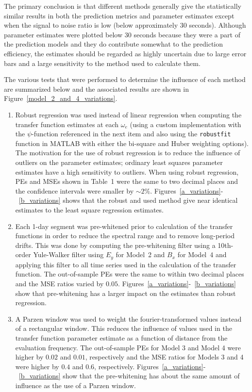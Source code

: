 \documentclass[draft,linenumbers]{agujournal2018}
\begin{document}
The primary conclusion is that different methods generally give the statistically similar results in both the prediction metrics and parameter estimates except when the signal to noise ratio is low (below approximately $30$ seconds). Although parameter estimates were plotted below $30$ seconds because they were a part of the prediction models and they do contribute somewhat to the prediction efficiency, the estimates should be regarded as highly uncertain due to large error bars and a large sensitivity to the method used to calculate them.

The various tests that were performed to determine the influence of each method are summarized below and the associated results are shown in Figure~\ref{model_2_and_4_variations}.

\begin{enumerate}

\item Robust regression was used instead of linear regression when computing the transfer function estimates at each $\omega_e$ (using a custom implementation with the $\psi$-function referenced in the next item and also using the \texttt{robustfit} function in MATLAB with either the bi-square and Huber weighting options). The motivation for the use of robust regression is to reduce the influence of outliers on the parameter estimates; ordinary least squares parameter estimates have a high sensitivity to outliers. When using robust regression, PEs and MSEs shown in Table~1 were the same to two decimal places and the confidence intervals were smaller by $\sim 2$\%. Figures~\ref{a_variations}-~\ref{b_variations} shows that the robust and used method give near identical estimates to the least square regression estimates.

\item Each 1-day segment was pre-whitened prior to calculation of the transfer functions in order to reduce the spectral range and to remove long-period drifts. This was done by computing the pre-whitening filter using a 10th-order Yule-Walker filter using $E_y$ for Model~2 and $B_x$ for Model~4 and applying this filter to all time series used in the calculation of the transfer function. The out-of-sample PEs were the same to within two decimal places and the MSE ratios varied by $0.05$.  Figures~\ref{a_variations}-~\ref{b_variations} show that pre-whitening has a larger impact on the estimates than robust regression.

\item A Parzen window was used to weight the fourier-transformed values instead of a rectangular window. This reduces the influence of values used in the transfer function parameter estimate as a function of distance from the evaluation frequency. The out-of-sample PEs for Model 3 and Model 4 were higher by $0.02$ and $0.01$, respectively and the MSE ratios for Models 3 and 4 were higher by $0.4$ and $0.6$, respectively. Figures~\ref{a_variations}-~\ref{b_variations} show that the pre-whitening has about the same amount of influence as the use of a Parzen window.


\end{enumerate}
\end{document}
